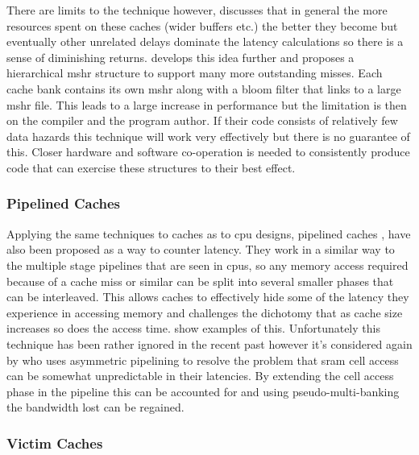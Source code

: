 There are limits to the technique however, \citet{belaynehDiscussionNonblockingLockupfree1996} discusses that in general the more resources spent on these caches (wider buffers etc.) the better they become but eventually other unrelated delays dominate the latency calculations so there is a sense of diminishing returns. \citet{tuckScalableCacheMiss2006} develops this idea further and proposes a hierarchical \gls{mshr} structure to support many more outstanding misses. Each cache bank contains its own \gls{mshr} along with a bloom filter that links to a large \gls{mshr} file. This leads to a large increase in performance but the limitation is then on the compiler and the program author. If their code consists of relatively few data hazards this technique will work very effectively but there is no guarantee of this. Closer hardware and software co-operation is needed to consistently produce code that can exercise these structures to their best effect.

\subsubsection{Pipelined Caches}

Applying the same techniques to caches as to \gls{cpu} designs, pipelined caches \cite{olukotunMultilevelOptimizationPipelined1997, olukotunPerformanceOptimizationPipelined1992}, have also been proposed as a way to counter latency. They work in a similar way to the multiple stage pipelines that are seen in \gls{cpu}s, so any memory access required because of a cache miss or similar can be split into several smaller phases that can be interleaved. This allows caches to effectively hide some of the latency they experience in accessing memory and challenges the dichotomy that as cache size increases so does the access time. \citet{srivastava190MHzCMOS4Kbyte1995, agarwalExploringHighBandwidth2003, martinDesignAsynchronousMIPS1997} show examples of this. Unfortunately this technique has been rather ignored  in the recent past however it's considered again by \citet{hongAVICAAccesstimeVariation2013} who uses asymmetric pipelining to resolve the problem that \gls{sram} cell access can be somewhat unpredictable in their latencies. By extending the cell access phase in the pipeline this can be accounted for and using pseudo-multi-banking the bandwidth lost can be regained.

\subsubsection{Victim Caches}

